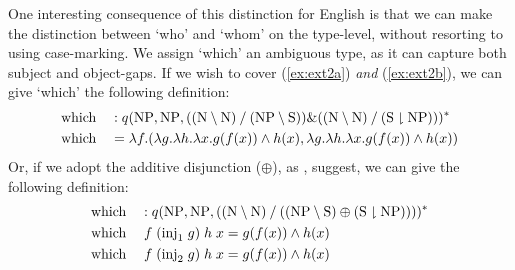 One interesting consequence of this distinction for English is that we
can make the distinction between `who' and `whom' on the type-level,
without resorting to using case-marking.
We assign `which' an ambiguous type, as it can capture both subject
and object-gaps. If we wish to cover (\ref{ex:ext2a}) \emph{and}
(\ref{ex:ext2b}), we can give `which' the following definition:
\begin{alignat*}{3}
  &\text{which} &&: \tr[{q(\NP,\NP,((\N\impr\N)\impl(\NP\impr\S))\&((\N\impr\N)\impl(\S\downharpoonright\NP)))}]\\
  &\text{which} &&= \lambda{f}.(\lambda{g}.\lambda{h}.\lambda{x}.g(f(x))\wedge h(x),\lambda{g}.\lambda{h}.\lambda{x}.g(f(x))\wedge h(x))
\end{alignat*}
Or, if we adopt the additive disjunction ($\oplus$), as
\citet{lambek1961}, \citet{morrill2015} suggest, we can give the
following definition:
\begin{alignat*}{3}
  &\text{which} &&: \tr[{q(\NP,\NP,((\N\impr\N)\impl((\NP\impr\S)\oplus(\S\downharpoonright\NP))))}]\\
  &\text{which} &&\;f\;(\text{inj}_1\;g)\;h\;x = g(f(x))\wedge h(x)\\
  &\text{which} &&\;f\;(\text{inj}_2\;g)\;h\;x = g(f(x))\wedge h(x)
\end{alignat*}



